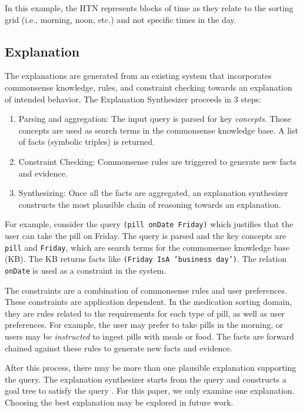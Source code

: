 \documentclass[letterpaper]{article} %
\begin{document}
In this example, the HTN represents blocks of time as they relate to the sorting grid (i.e., morning, noon, etc.) and not specific times in the day.











\subsection{Explanation}
The explanations are generated from an existing
system \cite{gilpin2018monitoring,leilanithesis} that incorporates commonsense
knowledge, rules, and constraint checking towards an explanation of
intended behavior.  The Explanation Synthesizer proceeds in 3 steps:
\begin{enumerate}
\item Parsing and aggregation: The input query is parsed for key \emph{concepts}.  Those
concepts are used as search terms in the commonsense knowledge base.  A list of facts (symbolic triples) is returned.
\item Constraint Checking: Commonsense rules are triggered to generate
new facts and evidence.
\item Synthesizing: Once all the facts are aggregated, an explanation
synthesizer constructs the most plausible chain of reasoning
towards an explanation.
\end{enumerate}

For example, consider the query \texttt{(pill onDate Friday)} which justifies that the user can take the pill on Friday.  The query is parsed and
the key concepts are \texttt{pill} and \texttt{Friday}, which are search terms for
the commonsense knowledge base (KB).  The KB returns facts like
\texttt{(Friday IsA 'business day')}.  The relation \texttt{onDate} is
used as a constraint in the system.

The constraints are a combination of commonsense rules and user
preferences.  These constraints are application dependent.   In the
medication sorting domain, they are rules related to the requirements
for each type of pill, as well as user preferences.  For example, the
user may prefer to take pills in the morning, or users may be
\emph{instructed} to ingest pills with meals or food.  The facts are
forward chained against these rules to generate new facts and
evidence.

After this process, there may be more than one plausible explanation
supporting the query.  The explanation synthesizer starts from the
query and constructs a goal tree to satisfy the query
\cite{leilanithesis}.  For this paper, we only examine one
explanation.  Choosing the best explanation may be explored in future
work.
\end{document}

